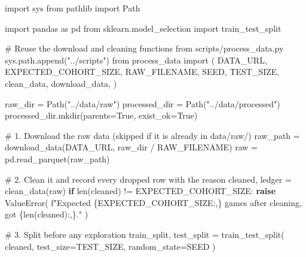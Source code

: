 \documentclass[
  letterpaper,
  DIV=11,
  numbers=noendperiod]{scrartcl}
\newenvironment{Shaded}{\begin{snugshade}}{\end{snugshade}}
\newcommand{\BuiltInTok}[1]{\textcolor[rgb]{0.00,0.23,0.31}{#1}}
\newcommand{\CommentTok}[1]{\textcolor[rgb]{0.37,0.37,0.37}{#1}}
\newcommand{\ControlFlowTok}[1]{\textcolor[rgb]{0.00,0.23,0.31}{\textbf{#1}}}
\newcommand{\ImportTok}[1]{\textcolor[rgb]{0.00,0.46,0.62}{#1}}
\newcommand{\NormalTok}[1]{\textcolor[rgb]{0.00,0.23,0.31}{#1}}
\newcommand{\OperatorTok}[1]{\textcolor[rgb]{0.37,0.37,0.37}{#1}}
\newcommand{\PreprocessorTok}[1]{\textcolor[rgb]{0.68,0.00,0.00}{#1}}
\newcommand{\SpecialCharTok}[1]{\textcolor[rgb]{0.37,0.37,0.37}{#1}}
\newcommand{\SpecialStringTok}[1]{\textcolor[rgb]{0.13,0.47,0.30}{#1}}
\newcommand{\StringTok}[1]{\textcolor[rgb]{0.13,0.47,0.30}{#1}}
\newcommand{\VariableTok}[1]{\textcolor[rgb]{0.07,0.07,0.07}{#1}}
\begin{document}
\begin{Shaded}
\begin{Highlighting}[]
\ImportTok{import}\NormalTok{ sys}
\ImportTok{from}\NormalTok{ pathlib }\ImportTok{import}\NormalTok{ Path}

\ImportTok{import}\NormalTok{ pandas }\ImportTok{as}\NormalTok{ pd}
\ImportTok{from}\NormalTok{ sklearn.model\_selection }\ImportTok{import}\NormalTok{ train\_test\_split}

\CommentTok{\# Reuse the download and cleaning functions from scripts/process\_data.py}
\NormalTok{sys.path.append(}\StringTok{"../scripts"}\NormalTok{)}
\ImportTok{from}\NormalTok{ process\_data }\ImportTok{import}\NormalTok{ (}
\NormalTok{    DATA\_URL,}
\NormalTok{    EXPECTED\_COHORT\_SIZE,}
\NormalTok{    RAW\_FILENAME,}
\NormalTok{    SEED,}
\NormalTok{    TEST\_SIZE,}
\NormalTok{    clean\_data,}
\NormalTok{    download\_data,}
\NormalTok{)}

\NormalTok{raw\_dir }\OperatorTok{=}\NormalTok{ Path(}\StringTok{"../data/raw"}\NormalTok{)}
\NormalTok{processed\_dir }\OperatorTok{=}\NormalTok{ Path(}\StringTok{"../data/processed"}\NormalTok{)}
\NormalTok{processed\_dir.mkdir(parents}\OperatorTok{=}\VariableTok{True}\NormalTok{, exist\_ok}\OperatorTok{=}\VariableTok{True}\NormalTok{)}

\CommentTok{\# 1. Download the raw data (skipped if it is already in data/raw/)}
\NormalTok{raw\_path }\OperatorTok{=}\NormalTok{ download\_data(DATA\_URL, raw\_dir }\OperatorTok{/}\NormalTok{ RAW\_FILENAME)}
\NormalTok{raw }\OperatorTok{=}\NormalTok{ pd.read\_parquet(raw\_path)}

\CommentTok{\# 2. Clean it and record every dropped row with the reason}
\NormalTok{cleaned, ledger }\OperatorTok{=}\NormalTok{ clean\_data(raw)}
\ControlFlowTok{if} \BuiltInTok{len}\NormalTok{(cleaned) }\OperatorTok{!=}\NormalTok{ EXPECTED\_COHORT\_SIZE:}
    \ControlFlowTok{raise} \PreprocessorTok{ValueError}\NormalTok{(}
        \SpecialStringTok{f"Expected }\SpecialCharTok{\{}\NormalTok{EXPECTED\_COHORT\_SIZE}\SpecialCharTok{:,\}}\SpecialStringTok{ games after cleaning, got }\SpecialCharTok{\{}\BuiltInTok{len}\NormalTok{(cleaned)}\SpecialCharTok{:,\}}\SpecialStringTok{."}
\NormalTok{    )}

\CommentTok{\# 3. Split before any exploration}
\NormalTok{train\_split, test\_split }\OperatorTok{=}\NormalTok{ train\_test\_split(}
\NormalTok{    cleaned, test\_size}\OperatorTok{=}\NormalTok{TEST\_SIZE, random\_state}\OperatorTok{=}\NormalTok{SEED}
\NormalTok{)}


\end{Highlighting}
\end{Shaded}
\end{document}
